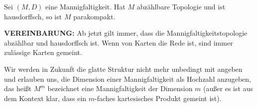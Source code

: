 \begin{proposition}
  Sei $(M,D)$ eine Mannigfaltigkeit. Hat $M$ abzählbare Topologie und
  ist hausdorffsch, so ist $M$ parakompakt.
\end{proposition}

\textbf{VEREINBARUNG:} Ab jetzt gilt immer, dass die
Mannigfaltigkeitstopologie abzählbar und hausdorffsch ist. Wenn von
Karten die Rede ist, sind immer zulässige Karten gemeint.

Wir werden in Zukunft die glatte Struktur nicht mehr unbedingt mit
angeben und erlauben uns, die Dimension einer Mannigfaltigkeit als
Hochzahl anzugeben, das heißt $M^m$ bezeichnet eine Mannigfaltigkeit
der Dimension $m$ (außer es ist aus dem Kontext klar, dass ein
$m$-faches kartesisches Produkt gemeint ist).

